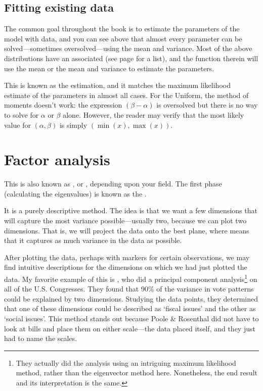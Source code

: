 \subsection{Fitting existing data}
The common goal throughout the book is to estimate the parameters of the
model with data, and you can see above that almost every parameter can
be solved---sometimes oversolved---using the mean and variance. Most of
the above distributions have an  associated (see page
\pageref{modellist} for a list), and the  function therein
will use the mean or the mean and variance to estimate the parameters.

This is known as the  estimation, and it
matches the maximum likelihood estimate of the parameters in almost all
cases. For the Uniform, the method of moments doesn't work: the
expression $(\beta - \alpha)$ is oversolved but there is no way to solve
for $\alpha$ or $\beta$ alone. However, the reader may verify that the
most likely value for $(\alpha, \beta)$ is simply $(\min(x), \max(x))$.


\section{Factor analysis} \label{pca} 
This is also known as , or , depending upon your field. 
The first phase (calculating the eigenvalues) is known as the .

It is a purely descriptive method.  The idea is that we want a few
dimensions that will capture the most variance possible---usually two,
because we can plot two dimensions. That is, we will project the data
onto the best plane, where  means that it captures as much
variance in the data as possible.

After plotting the data, perhaps with markers for certain observations,
we may find intuitive descriptions for the dimensions on which we had just plotted the
data. My favorite example of this is \citet{poole:rosenthal},
who did a principal component analysis\footnote{They actually did
the analysis using an intriguing maximum likelihood method, rather
than the eigenvector method here. Nonetheless, the end result and its
interpretation is the same.} on all of the U.S. Congresses. They found
that 90\% of the variance in vote patterns could be explained by two dimensions.
Studying the data points, they determined that one of these dimensions could be
described as `fiscal issues' and the other as `social issues'. This method stands
out because Poole \& Rosenthal did not have to look at bills and place them on
either scale---the data placed itself, and they just had to name the scales.


